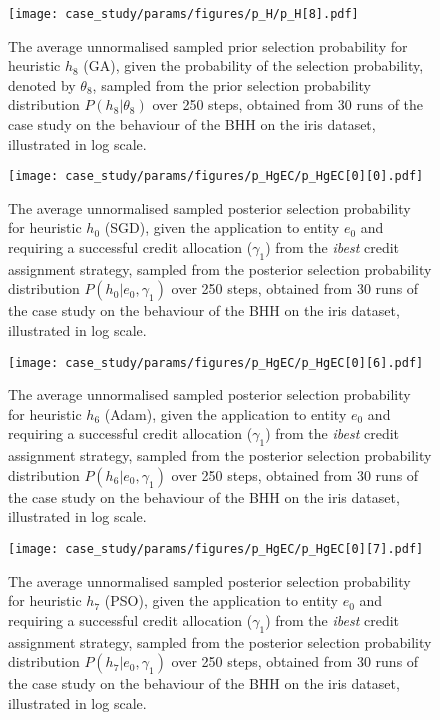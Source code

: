 \begin{figure}[htpb]
	\centering
	\texttt{[image: case\_study/params/figures/p\_H/p\_H[8].pdf]}
	\caption{The average unnormalised sampled prior selection probability for heuristic $h_{8}$ (\acs{GA}), given the probability of the selection probability, denoted by $\theta_{8}$, sampled from the prior selection probability distribution $P(h_{8} \vert \theta_{8})$ over 250 steps, obtained from 30 runs of the case study on the behaviour of the \acs{BHH} on the iris dataset, illustrated in log scale.}
	\label{fig:results:case_study:p_H:8}
\end{figure}


\begin{figure}[htpb]
	\centering
	\texttt{[image: case\_study/params/figures/p\_HgEC/p\_HgEC[0][0].pdf]}
	\caption{The average unnormalised sampled posterior selection probability for heuristic $h_{0}$ (\acs{SGD}), given the application to entity $e_{0}$ and requiring a successful credit allocation ($\gamma_{1}$) from the \textit{ibest} credit assignment strategy, sampled from the posterior selection probability distribution $P(h_{0} \vert e_{0}, \gamma_{1})$ over 250 steps, obtained from 30 runs of the case study on the behaviour of the \acs{BHH} on the iris dataset, illustrated in log scale.}
	\label{fig:results:case_study:p_HgEC:0:0}
\end{figure}


\begin{figure}[htpb]
	\centering
	\texttt{[image: case\_study/params/figures/p\_HgEC/p\_HgEC[0][6].pdf]}
	\caption{The average unnormalised sampled posterior selection probability for heuristic $h_{6}$ (\acs{Adam}), given the application to entity $e_{0}$ and requiring a successful credit allocation ($\gamma_{1}$) from the \textit{ibest} credit assignment strategy, sampled from the posterior selection probability distribution $P(h_{6} \vert e_{0}, \gamma_{1})$ over 250 steps, obtained from 30 runs of the case study on the behaviour of the \acs{BHH} on the iris dataset, illustrated in log scale.}
	\label{fig:results:case_study:p_HgEC:0:6}
\end{figure}

\begin{figure}[htpb]
	\centering
	\texttt{[image: case\_study/params/figures/p\_HgEC/p\_HgEC[0][7].pdf]}
	\caption{The average unnormalised sampled posterior selection probability for heuristic $h_{7}$ (\acs{PSO}), given the application to entity $e_{0}$ and requiring a successful credit allocation ($\gamma_{1}$) from the \textit{ibest} credit assignment strategy, sampled from the posterior selection probability distribution $P(h_{7} \vert e_{0}, \gamma_{1})$ over 250 steps, obtained from 30 runs of the case study on the behaviour of the \acs{BHH} on the iris dataset, illustrated in log scale.}
	\label{fig:results:case_study:p_HgEC:0:7}
\end{figure}

